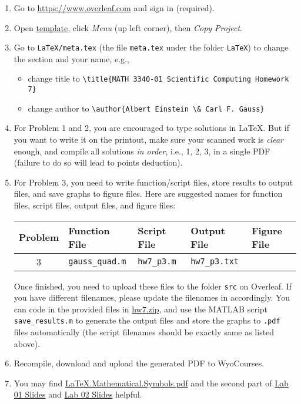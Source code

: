 \begin{enumerate}[label={\arabic*.}]
  \item Go to \url{https://www.overleaf.com} and sign in (required).
  \item Open \href{https://www.overleaf.com/read/cxvtwczyygnm}{template}, click \emph{Menu} (up left corner), then \emph{Copy Project}.
  \item Go to \verb|LaTeX/meta.tex| (the file \verb|meta.tex| under the folder \verb|LaTeX|) to change the section and your name, e.g.,
    \begin{itemize}
      \item change title to \verb|\title{MATH 3340-01 Scientific Computing Homework 7}|
      \item change author to \verb|\author{Albert Einstein \& Carl F. Gauss}|
    \end{itemize}
  \item For Problem 1 and 2, you are encouraged to type solutions in \LaTeX{}. But if you want to write it on the printout, make sure your scanned work is \emph{clear} enough, and compile all solutions \emph{in order}, i.e., 1, 2, 3, in a single PDF (failure to do so will lead to points deduction).
  \item For Problem 3, you need to write function/script files, store results to output files, and save graphs to figure files. Here are suggested names for function files, script files, output files, and figure files:
    \begin{table}[!hbtp]
      \centering
      \begin{tabular}{cllll}
        \toprule
        Problem & Function File       & Script File     & Output File      & Figure File   \\
        \midrule
        3       & \verb|gauss_quad.m| & \verb|hw7_p3.m| & \verb|hw7_p3.txt| &               \\
        \bottomrule
      \end{tabular}
    \end{table}

    Once finished, you need to upload these files to the folder \verb|src| on Overleaf. If you have different filenames, please update the filenames in \verb|| accordingly. You can code in the provided files in \href{https://libaoj.in/courses/2020f/MATH3340/Homework/7/hw7.zip}{hw7.zip}, and use the MATLAB script \verb|save_results.m| to generate the output files and store the graphs to \verb|.pdf| files automatically (the script filenames should be exactly same as listed above).
  \item Recompile, download and upload the generated PDF to WyoCourses.
  \item You may find \href{https://libaoj.in/files/LaTeX.Mathematical.Symbols.pdf}{\LaTeX{}.Mathematical.Symbols.pdf} and the second part of \href{https://libaoj.in/courses/2020f/MATH3341/slides/Math.3341.Lab.01.Slides.pdf}{Lab 01 Slides} and \href{https://libaoj.in/courses/2020f/MATH3341/slides/Math.3341.Lab.02.Slides.pdf}{Lab 02 Slides} helpful.
\end{enumerate}
\newpage

